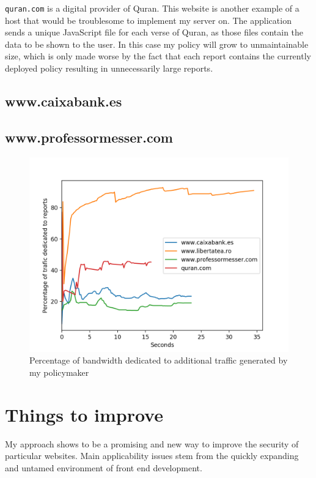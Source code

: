 \texttt{quran.com} is a digital provider of Quran. 
This website is another example of a host that would be troublesome to implement my server on.
The application sends a unique JavaScript file for each verse of Quran, as those files contain the data to be shown to the user.
In this case my policy will grow to unmaintainable size, which is only made worse by the fact that each report contains the currently deployed policy resulting in unnecessarily large reports.

\subsection{www.caixabank.es}

\subsection{www.professormesser.com}


\begin{figure}[h]
	\centering
	\includegraphics[width=\textwidth]{imgs/netword_usage_plot.png}
	\caption{Percentage of bandwidth dedicated to additional traffic generated by my policymaker}
\end{figure}


\section{Things to improve}

My approach shows to be a promising and new way to improve the security of particular websites.
Main applicability issues stem from the quickly expanding and untamed environment of front end development.

